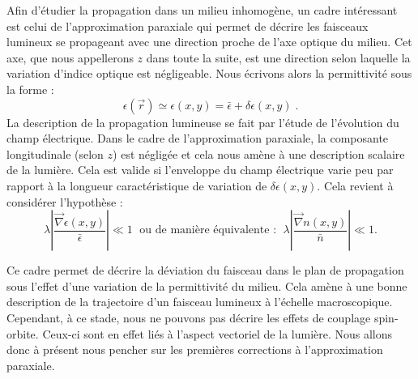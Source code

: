 \documentclass[a4paper,11pt]{article} %
\begin{document}
	Afin d'étudier la propagation dans un milieu inhomogène, un cadre intéressant est celui de l'approximation paraxiale qui permet de décrire les faisceaux lumineux se propageant avec une direction proche de l'axe optique du milieu. Cet axe, que nous appellerons $ z $ dans toute la suite, est une direction selon laquelle la variation d'indice optique est négligeable. Nous écrivons alors la permittivité sous la forme :
	\begin{equation*}
		\epsilon(\vec{r}) \simeq \epsilon(x,y) = \bar{\epsilon} + \delta \epsilon(x,y) \; .
	\end{equation*}
	La description de la propagation lumineuse se fait par l'étude de l'évolution du champ électrique. Dans le cadre de l'approximation paraxiale, la composante longitudinale (selon $ z $) est négligée et cela nous amène à une description scalaire de la lumière. Cela est valide si l'enveloppe du champ électrique varie peu par rapport à la longueur caractéristique de variation de $\delta \epsilon (x,y)$. Cela revient à considérer l'hypothèse : 
	\begin{equation}
		\label{hyp_var_epsilon}
		\lambda \left| \frac{\vec{\nabla}\epsilon(x,y)}{\bar{\epsilon}} \right| \ll 1 \; \text{ ou de manière équivalente : } \; \lambda \left| \frac{\vec{\nabla}n(x,y)}{\bar{n}} \right| \ll 1 .
	\end{equation}
	
	
	Ce cadre permet de décrire la déviation du faisceau dans le plan de propagation sous l'effet d'une variation de la permittivité du milieu. Cela amène à une bonne description de la trajectoire d'un faisceau lumineux à l'échelle macroscopique. Cependant, à ce stade, nous ne pouvons pas décrire les effets de couplage spin-orbite. Ceux-ci sont en effet liés à l'aspect vectoriel de la lumière. Nous allons donc à présent nous pencher sur les premières corrections à l'approximation paraxiale.
	
\end{document}

